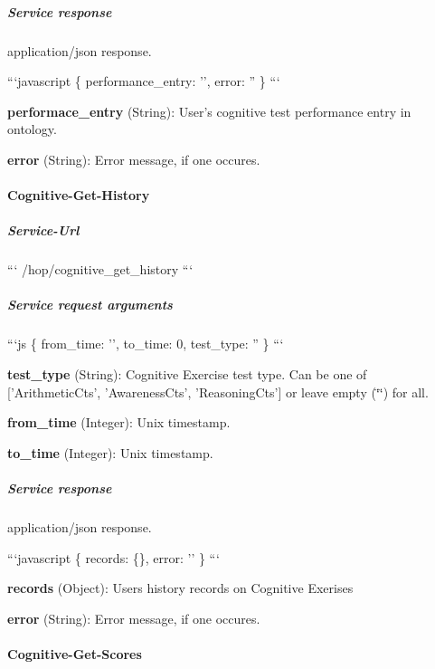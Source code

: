 \subparagraph*{Service response}

application/json response.

```javascript \{ performance\-\_\-entry\-: '', error\-: '' \} ```


\begin{DoxyItemize}
\item {\bfseries performace\-\_\-entry} (String)\-: User's cognitive test performance entry in ontology.
\item {\bfseries error} (String)\-: Error message, if one occures.
\end{DoxyItemize}

\paragraph*{Cognitive-\/\-Get-\/\-History}

\subparagraph*{Service-\/\-Url}

``` /hop/cognitive\-\_\-get\-\_\-history ```

\subparagraph*{Service request arguments}

```js \{ from\-\_\-time\-: '', to\-\_\-time\-: 0, test\-\_\-type\-: '' \} ```


\begin{DoxyItemize}
\item {\bfseries test\-\_\-type} (String)\-: Cognitive Exercise test type. Can be one of \mbox{[}'Arithmetic\-Cts', 'Awareness\-Cts', 'Reasoning\-Cts'\mbox{]} or leave empty (\char`\"{}\char`\"{}) for all.
\item {\bfseries from\-\_\-time} (Integer)\-: Unix timestamp.
\item {\bfseries to\-\_\-time} (Integer)\-: Unix timestamp.
\end{DoxyItemize}

\subparagraph*{Service response}

application/json response.

```javascript \{ records\-: \{\}, error\-: '' \} ```


\begin{DoxyItemize}
\item {\bfseries records} (Object)\-: Users history records on Cognitive Exerises
\item {\bfseries error} (String)\-: Error message, if one occures.
\end{DoxyItemize}

\paragraph*{Cognitive-\/\-Get-\/\-Scores}

